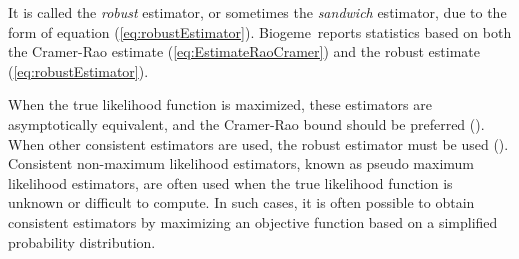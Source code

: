 \documentclass[12pt,a4paper]{article}
\newcommand{\req}[1]{(\ref{#1})}
\newcommand{\BIOGEME}{Biogeme}
\begin{document}
It is
called the \emph{robust} estimator, or sometimes the \emph{sandwich}
estimator, due to the form of equation
\req{eq:robustEstimator}. \BIOGEME\ reports statistics based on  both the Cramer-Rao estimate
\req{eq:EstimateRaoCramer} and the robust estimate \req{eq:robustEstimator}.


 When the true likelihood function is maximized,  these estimators are
 asymptotically equivalent, and the Cramer-Rao bound should be
preferred (\cite{KaueCarr2001}).  When other consistent estimators are
used, the robust estimator must be used
(\cite{Whit82}). Consistent non-maximum likelihood estimators, known
as pseudo maximum likelihood estimators, are often used when the true
likelihood function is unknown or difficult to compute. In such cases,
it is often possible to obtain consistent estimators by maximizing an
objective function based on a simplified probability distribution. 



\end{document}

